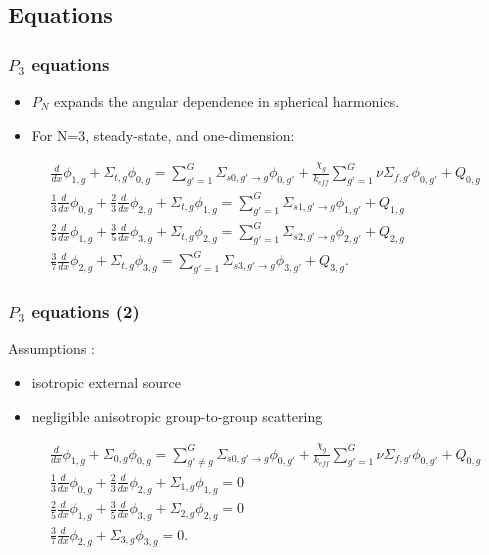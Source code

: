 
\subsection{Equations}
\begin{frame}
\frametitle{$P_3$ equations}

\begin{itemize}
  \item $P_N$ expands the angular dependence in spherical harmonics.
  \item For N=3, steady-state, and one-dimension:
\end{itemize}

\begin{align}
    & \frac{d}{dx} \phi_{1,g} + \Sigma_{t,g} \phi_{0,g} = \sum_{g'=1}^G \Sigma_{s0,g' \rightarrow g} \phi_{0,g'} + \frac{\chi_g}{k_{eff}} \sum_{g'=1}^G \nu\Sigma_{f,g'} \phi_{0,g'} + Q_{0,g}  \label{eq:SP3-0} \\
    & \frac{1}{3} \frac{d}{dx} \phi_{0,g} + \frac{2}{3}\frac{d}{dx}\phi_{2,g} + \Sigma_{t,g} \phi_{1,g} = \sum_{g'=1}^G \Sigma_{s1,g' \rightarrow g} \phi_{1,g'} + Q_{1,g} \label{eq:SP3-1} \\
    & \frac{2}{5} \frac{d}{dx}\phi_{1,g} + \frac{3}{5}\frac{d}{dx}\phi_{3,g} + \Sigma_{t,g} \phi_{2,g} = \sum_{g'=1}^G \Sigma_{s2,g' \rightarrow g} \phi_{2,g'} + Q_{2,g} \label{eq:SP3-2} \\
    & \frac{3}{7}\frac{d}{dx}\phi_{2,g} + \Sigma_{t,g} \phi_{3,g} = \sum_{g'=1}^G \Sigma_{s3,g' \rightarrow g} \phi_{3,g'} + Q_{3,g}. \label{eq:P3-3}
\end{align}
\end{frame}


\begin{frame}
\frametitle{$P_3$ equations (2)}

Assumptions \cite{brantley_simplifiedP3_2000}:
\begin{itemize}
	\item isotropic external source
	\item negligible anisotropic group-to-group scattering
\end{itemize}

\begin{align}
    & \frac{d}{dx} \phi_{1,g} + \Sigma_{0,g} \phi_{0,g} = \sum_{g'\ne g}^G \Sigma_{s0,g' \rightarrow g} \phi_{0,g'} + \frac{\chi_g}{k_{eff}} \sum_{g'=1}^G \nu\Sigma_{f,g'} \phi_{0,g'} + Q_{0,g}  \label{eq:SP3-0b} \\
    & \frac{1}{3} \frac{d}{dx} \phi_{0,g} + \frac{2}{3}\frac{d}{dx}\phi_{2,g} + \Sigma_{1,g} \phi_{1,g} = 0  \label{eq:SP3-1b} \\
    & \frac{2}{5} \frac{d}{dx}\phi_{1,g} + \frac{3}{5}\frac{d}{dx}\phi_{3,g} + \Sigma_{2,g} \phi_{2,g} = 0  \label{eq:SP3-2b} \\
    & \frac{3}{7}\frac{d}{dx}\phi_{2,g} + \Sigma_{3,g} \phi_{3,g} = 0. \label{eq:SP3-3b}
\end{align}
\end{frame}



